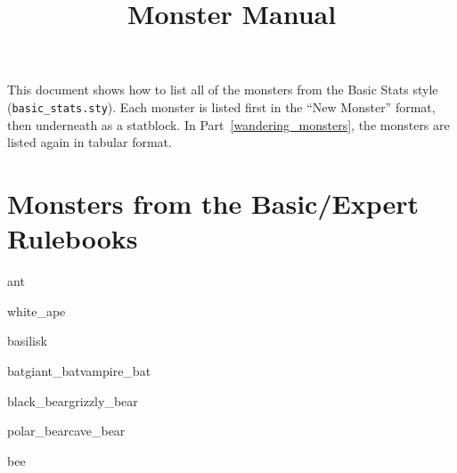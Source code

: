 \documentclass[a4paper,serif]{module}
\begin{document}
\raggedbottom

\title{Monster Manual}

\showtitle

This document shows how to list all of the monsters from the Basic Stats style (\verb|basic_stats.sty|).
Each monster is listed first in the ``New Monster'' format, then underneath as a statblock. In
Part~\ref{wandering_monsters}, the monsters are listed again in tabular format.

\part{Monsters from the Basic/Expert Rulebooks}

\begin{newmonster}{ant}
\lipsum[1]
\end{newmonster}

\begin{newmonster}{white_ape}\end{newmonster}

\begin{newmonster}{basilisk}\end{newmonster}



\begin{newmonster3}{bat}{giant_bat}{vampire_bat}
\lipsum[1]
\end{newmonster3}


\begin{newmonster2}{black_bear}{grizzly_bear}\end{newmonster2}
\begin{newmonster2*}{polar_bear}{cave_bear}{}{}\lipsum[2]\end{newmonster2*}

\begin{newmonster}{bee}\end{newmonster}
\end{document}
